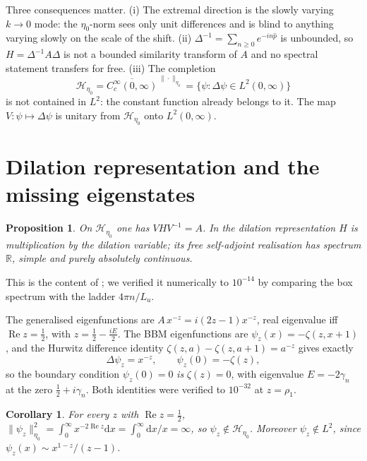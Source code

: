 \documentclass[11pt,a4paper]{article}
\newtheorem{proposition}[theorem]{Proposition}
\newtheorem{corollary}[theorem]{Corollary}
\theoremstyle{remark}
\newcommand{\R}{\mathbb{R}}
\newcommand{\Hil}{\mathcal{H}}
\newcommand{\dd}{\mathrm{d}}
\begin{document}
Three consequences matter. (i) The extremal direction is the slowly varying $k\to0$ mode: the
$\eta_0$-norm sees only unit differences and is blind to anything varying slowly on the scale of
the shift. (ii) $\Delta^{-1}=\sum_{n\ge0}e^{-in\hat p}$ is unbounded, so $H=\Delta^{-1}A\Delta$ is
not a bounded similarity transform of $A$ and no spectral statement transfers for free. (iii) The
completion
\begin{equation}\label{eq:completion}
\Hil_{\eta_0}=\overline{C_c^\infty(0,\infty)}^{\,\|\cdot\|_{\eta_0}}
=\{\psi:\Delta\psi\in L^2(0,\infty)\}
\end{equation}
is not contained in $L^2$: the constant function already belongs to it. The map
$V:\psi\mapsto\Delta\psi$ is unitary from $\Hil_{\eta_0}$ onto $L^2(0,\infty)$.

\section{Dilation representation and the missing eigenstates}\label{sec:dil}

\begin{proposition}\label{prop:dil}
On $\Hil_{\eta_0}$ one has $VHV^{-1}=A$. In the dilation representation $H$ is multiplication by
the dilation variable; its free self-adjoint realisation has spectrum $\R$, simple and purely
absolutely continuous.
\end{proposition}

This is the content of \cite{Liu2026}; we verified it numerically to $10^{-14}$ by comparing the
box spectrum with the ladder $4\pi n/L_u$.

The generalised eigenfunctions are $A\,x^{-z}=i(2z-1)x^{-z}$, real eigenvalue iff
$\operatorname{Re}z=\frac12$, with $z=\frac12-\frac{iE}{2}$. The BBM eigenfunctions are
$\psi_z(x)=-\zeta(z,x+1)$, and the Hurwitz difference identity $\zeta(z,a)-\zeta(z,a+1)=a^{-z}$
gives exactly
\begin{equation}\label{eq:hurwitz}
\Delta\psi_z=x^{-z},\qquad \psi_z(0)=-\zeta(z),
\end{equation}
so the boundary condition $\psi_z(0)=0$ \emph{is} $\zeta(z)=0$, with eigenvalue $E=-2\gamma_n$ at
the zero $\tfrac12+i\gamma_n$. Both identities were verified to $10^{-32}$ at $z=\rho_1$.

\begin{corollary}\label{cor:missing}
For every $z$ with $\operatorname{Re}z=\frac12$,
$\|\psi_z\|_{\eta_0}^2=\int_0^\infty x^{-2\operatorname{Re}z}\dd x=\int_0^\infty \dd x/x=\infty$,
so $\psi_z\notin\Hil_{\eta_0}$. Moreover $\psi_z\notin L^2$, since
$\psi_z(x)\sim x^{1-z}/(z-1)$.
\end{corollary}
\end{document}
